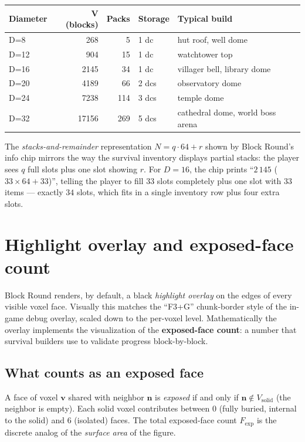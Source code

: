 \documentclass[12pt,a4paper]{scrartcl}
\newcommand{\acc}[1]{\textcolor{accent}{\textbf{#1}}}
\begin{document}
\vspace{0.4em}
\begin{center}
\small
\begin{tabularx}{\textwidth}{@{}lrrlX@{}}
\toprule
\textbf{Diameter} & \textbf{V (blocks)} & \textbf{Packs} & \textbf{Storage} & \textbf{Typical build} \\
\midrule
D=8   &   268 &  5  &  1 dc & hut roof, well dome  \\
D=12  &   904 & 15  &  1 dc & watchtower top \\
D=16  &  2145 & 34  &  1 dc & villager bell, library dome \\
D=20  &  4189 & 66  &  2 dcs & observatory dome \\
D=24  &  7238 & 114 &  3 dcs & temple dome \\
D=32  & 17156 & 269 &  5 dcs & cathedral dome, world boss arena \\
\bottomrule
\end{tabularx}
\end{center}

The \emph{stacks-and-remainder} representation $N = q \cdot 64 + r$ shown by Block Round's info chip mirrors the way the survival inventory displays partial stacks: the player sees $q$ full slots plus one slot showing $r$. For $D=16$, the chip prints \enquote{$2\,145$ ($33 \times 64 + 33$)}, telling the player to fill $33$ slots completely plus one slot with $33$ items --- exactly $34$ slots, which fits in a single inventory row plus four extra slots.

\section{Highlight overlay and exposed-face count}

Block Round renders, by default, a black \emph{highlight overlay} on the edges of every visible voxel face. Visually this matches the \enquote{F3+G} chunk-border style of the in-game debug overlay, scaled down to the per-voxel level. Mathematically the overlay implements the visualization of the \acc{exposed-face count}: a number that survival builders use to validate progress block-by-block.

\subsection{What counts as an exposed face}
A face of voxel $\mathbf{v}$ shared with neighbor $\mathbf{n}$ is \emph{exposed} if and only if $\mathbf{n} \notin V_{\mathrm{solid}}$ (the neighbor is empty). Each solid voxel contributes between $0$ (fully buried, internal to the solid) and $6$ (isolated) faces. The total exposed-face count $F_{\mathrm{exp}}$ is the discrete analog of the \emph{surface area} of the figure.
\end{document}
